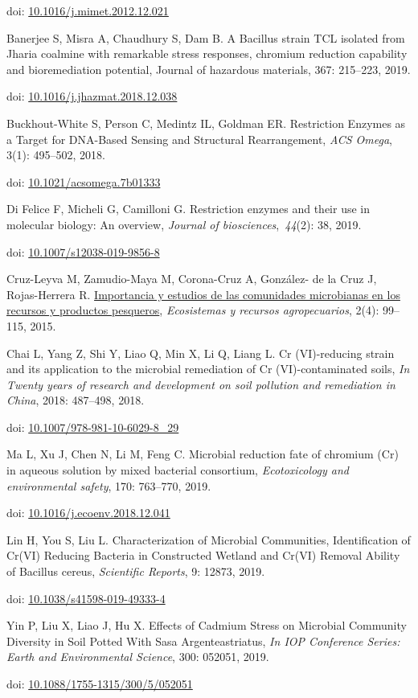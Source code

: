 \begin{thebibliography}{99}
doi: \href{https://doi.org/10.1016/j.mimet.2012.12.021}{10.1016/j.mimet.2012.12.021}

 Banerjee S, Misra A, Chaudhury S, Dam B. A Bacillus strain TCL
isolated from Jharia coalmine with remarkable stress responses, chromium
reduction capability and bioremediation potential, Journal of hazardous
materials, 367: 215--223, 2019.

doi: \href{https://doi.org/10.1016/j.jhazmat.2018.12.038}{10.1016/j.jhazmat.2018.12.038}

 Buckhout-White S, Person C, Medintz IL, Goldman ER. Restriction
Enzymes as a Target for DNA-Based Sensing and Structural Rearrangement,
\emph{ACS Omega}, 3(1): 495--502, 2018.

doi: \href{https://doi.org/10.1021/acsomega.7b01333}{10.1021/acsomega.7b01333}

 Di Felice F, Micheli G, Camilloni G. Restriction enzymes and
their use in molecular biology: An overview, \emph{Journal of
biosciences},~\emph{44}(2): 38, 2019.

doi: \href{https://doi.org/10.1007/s12038-019-9856-8}{10.1007/s12038-019-9856-8}

 Cruz-Leyva M, Zamudio-Maya M, Corona-Cruz A, González- de la
Cruz J, Rojas-Herrera R.
\href{http://www.scielo.org.mx/scielo.php?pid=S2007-90282015000100008\&script=sci_arttext}{Importancia y estudios de las comunidades microbianas en los recursos y productos pesqueros}, \emph{Ecosistemas y
recursos agropecuarios}, 2(4): 99--115, 2015.

 Chai L, Yang Z, Shi Y, Liao Q, Min X, Li Q, Liang L. Cr
(VI)-reducing strain and its application to the microbial remediation of
Cr (VI)-contaminated soils, \emph{In Twenty years of research and
development on soil pollution and remediation in China}, 2018: 487--498,
2018.

doi: \href{https://doi.org/10.1007/978-981-10-6029-8_29}{10.1007/978-981-10-6029-8\_29}

 Ma L, Xu J, Chen N, Li M, Feng C. Microbial reduction fate of
chromium (Cr) in aqueous solution by mixed bacterial consortium,
\emph{Ecotoxicology and environmental safety}, 170: 763--770, 2019.

doi: \href{https://doi.org/10.1016/j.ecoenv.2018.12.041}{10.1016/j.ecoenv.2018.12.041}

 Lin H, You S, Liu L. Characterization of Microbial Communities,
Identification of Cr(VI) Reducing Bacteria in Constructed Wetland and
Cr(VI) Removal Ability of Bacillus cereus, \emph{Scientific Reports}, 9:
12873, 2019.

doi: \href{https://doi.org/10.1038/s41598-019-49333-4}{10.1038/s41598-019-49333-4}

 Yin P, Liu X, Liao J, Hu X. Effects of Cadmium Stress on
Microbial Community Diversity in Soil Potted With Sasa Argenteastriatus,
\emph{In IOP Conference Series: Earth and Environmental Science}, 300:
052051, 2019.

doi: \href{https://doi.org/10.1088/1755-1315/300/5/052051}{10.1088/1755-1315/300/5/052051}
        
\end{thebibliography}
